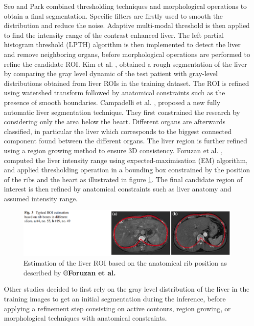 \documentclass[]{article}
\begin{document}
	
	
	Seo and Park \cite{Seo2005} 
	combined thresholding techniques and morphological operations to obtain
	a final segmentation. Specific filters are firstly used to smooth the
	distribution and reduce the noise. Adaptive multi-modal threshold is
	then applied to find the intensity range of the contrast enhanced liver.
	The left partial histogram threshold (LPTH) algorithm is then
	implemented to detect the liver and remove neighboring organs, before
	morphological operations are performed to refine the candidate ROI.
	Kim et al. \cite{Kim2007}, obtained a rough segmentation of the liver by comparing the gray
	level dynamic of the test patient with gray-level distributions obtained
	from liver ROIs in the training dataset. The ROI is refined using
	watershed transform followed by anatomical constraints such as the
	presence of smooth boundaries.
	Campadelli et al. \cite{Campadelli2009}, proposed a new fully automatic liver segmentation
	technique. They first constrained the research by considering only the
	area below the heart. Different organs are afterwards classified, in
	particular the liver which corresponds to the biggest connected
	component found between the different organs. The liver region is
	further refined using a region growing method to ensure 3D consistency.
	Foruzan et al. \cite{Foruzan2009}, computed the liver intensity range using
	expected-maximisation (EM) algorithm, and applied thresholding operation
	in a bounding box constrained by the position of the ribs and the heart
	as illustrated in figure \ref{ForuzanFig3}. The final candidate region of interest is then
	refined by anatomical constraints such as liver anatomy and assumed
	intensity range.
	
	\begin{figure} [ht!]
		\centering
		\label{ForuzanFig3}
		\includegraphics[width=0.7\linewidth]{images/image1}
		\caption{Estimation of the liver ROI based on the anatomical rib position as described by \textbf{©Foruzan et al.} \cite{Foruzan2009}}
	\end{figure}
	
	
	Other studies decided to first rely on the gray level distribution of
	the liver in the training images to get an initial segmentation during
	the inference, before applying a refinement step consisting on active
	contours, region growing, or morphological techniques with anatomical
	constraints.
	
\end{document}
